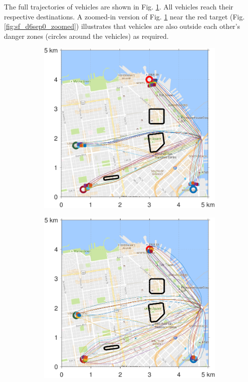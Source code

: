 The full trajectories of vehicles are shown in Fig. \ref{fig:sf_d6sep0}. All vehicles reach their respective destinations. A zoomed-in version of Fig. \ref{fig:sf_d6sep0} near the red target (Fig. \ref{fig:sf_d6sep0_zoomed}) illustrates that vehicles are also outside each other's danger zones (circles around the vehicles) as required. 

\begin{figure}
  \centering
  \begin{subfigure}{0.5\textwidth}
    \includegraphics[width=\columnwidth]{figs/sf_d6sep0}
    \label{fig:sf_d6sep0}
  \end{subfigure}%
  \begin{subfigure}{0.5\textwidth}
    \includegraphics[width=\columnwidth]{figs/sf_d11sep0}
    \label{fig:sf_d11sep0}
  \end{subfigure}
  

\end{figure}
